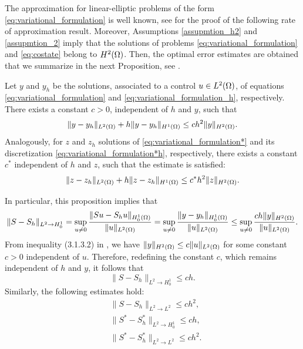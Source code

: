 %
The approximation for linear-elliptic problems 
of the form \eqref{eq:variational_formulation} 
is well known, {see \cite[Sections 17-18]{ciarlet1990}} 
for the proof of the following rate of approximation result.
Moreover, Assumptions \ref{assupmtion_h2} and 
\ref{assupmtion_2} imply that the solutions of problems 
\eqref{eq:variational_formulation} and \eqref{eq:costate} belong to $H^2(\Omega)$. Then, the optimal error estimates are obtained that we summarize in the next Proposition, see \cite[Theorem 18.1-19.2]{ciarlet1990}.
%
\begin{proposition}\label{p:state_estimate}
Let $y$ and $y_h$ be the solutions, associated to a control $u \in L^2(\Omega)$, of equations \eqref{eq:variational_formulation} and \eqref{eq:variational_formulation_h}, respectively. There exists a constant $c>0$, independent of $h$ and $y$, such that 
\begin{equation}	
\|y-y_h\|_{L^2(\Omega)} + h\|y-y_h\|_{H^1(\Omega)}\leq c h^2\|y\|_{H^2(\Omega)}. \label{eq:variational_formulation_estimate}
\end{equation}
Analogously, for $z$ and $z_h$ solutions of \eqref{eq:variational_formulation*} and its discretization \eqref{eq:variational_formulation*h}, respectively, there exists a constant $c^*$ independent of $h$ and $z$, such that the estimate is satisfied:
\begin{equation}	
	\|z-z_h\|_{L^2(\Omega)} + h\|z-z_h\|_{H^1(\Omega)}\leq c^* h^2 \|z\|_{H^2(\Omega)}. \label{eq:variational_formulation_estimate*}
\end{equation}
\end{proposition}
%
In particular, this proposition implies that 
%
\begin{align*}
	\|S-S_h\|_{L^2 \to H_0^1} =  \sup_{u\not =0 } \frac{ \|Su-S_hu\|_{H_0^1(\Omega)}}{\lVert u \rVert_{L^2(\Omega)}}  
	= \sup_{u\not =0 } \frac{ \|y-y_h\|_{H_0^1(\Omega)}}{\lVert u \rVert_{L^2(\Omega)}}    
	\leq  \sup_{u\not =0  } \frac{ ch\|y\|_{H^2(\Omega)} }{\lVert u \rVert_{L^2(\Omega)}}. \nonumber  
\end{align*}
From inequality (3.1.3.2) in \cite{gri85}, we have $\|y\|_{H^2(\Omega)} \leq c \|u\|_{L^2(\Omega)}$ for some constant $c>0$ independent of $u$. Therefore, redefining the constant $c$, which remains independent of $h$ and $y$, it follows that
\begin{equation}\label{eq:S-S_h-1}
	\|S-S_h\|_{L^2 \to H_0^1}	\leq  ch. 
\end{equation}
Similarly, the following estimates hold:
\begin{align}
	&\|S-S_h\|_{L^2 \to L^2}	\leq   ch^2, \label{eq:S-S_h-2} \\
	&\|S^*-S^*_h\|_{L^2 \to H_0^1}	\leq   ch, \label{eq:S-S_h-3} \\
	&\|S^*-S^*_h\|_{L^2 \to L^2}	\leq  ch^2. \label{eq:S-S_h-4}
\end{align}
 
